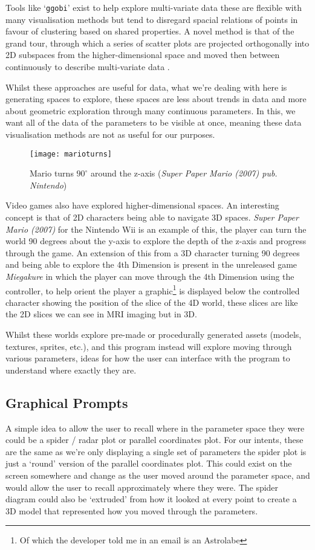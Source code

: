 Tools like `\verb|ggobi|' exist to help explore multi-variate data
\citep{swayne:dsc2003} these are flexible with many visualisation methods but
tend to disregard spacial relations of points in favour of clustering based on
shared properties. A novel method is that of the grand tour, through which a
series of scatter plots are projected orthogonally into 2D subspaces from the
higher-dimensional space and moved then between continuously to describe
multi-variate data \citep{asimov1985grand}.

Whilst these approaches are useful for data, what we're dealing with here is
generating spaces to explore, these spaces are less about trends in data and
more about geometric exploration through many continuous parameters. In this, we
want all of the data of the parameters to be visible at once, meaning these data
visualisation methods are not as useful for our purposes.

\begin{figure}[H]
    \centering
    \texttt{[image: marioturns]}
    \caption{Mario turns $90^\circ$ around the z-axis (\emph{Super Paper Mario
    (2007) pub. Nintendo})}
\end{figure}

Video games also have explored higher-dimensional spaces. An interesting concept
is that of 2D characters being able to navigate 3D spaces.  \emph{Super Paper
Mario (2007)} for the Nintendo Wii is an example of this, the player can turn
the world 90 degrees about the y-axis to explore the depth of the z-axis and
progress through the game. An extension of this from a 3D character turning 90
degrees and being able to explore the 4th Dimension is present in the unreleased
game \emph{Miegakure} in which the player can move through the 4th Dimension
using the controller, to help orient the player a graphic\footnote{Of which the
developer told me in an email is an Astrolabe} is displayed below the controlled
character showing the position of the slice of the 4D world, these slices are
like the 2D slices we can see in MRI imaging but in 3D.

Whilst these worlds explore pre-made or procedurally generated assets (models,
textures, sprites, etc.), and this program instead will explore moving through
various parameters, ideas for how the user can interface with the program to
understand where exactly they are.

\subsection{Graphical Prompts}
A simple idea to allow the user to recall where in the parameter space they were
could be a spider / radar plot or parallel coordinates plot. For our intents, these
are the same as we're only displaying a single set of parameters the spider plot
is just a `round' version of the parallel coordinates plot. This could exist on
the screen somewhere and change as the user moved around the parameter space,
and would allow the user to recall approximately where they were. The spider
diagram could also be `extruded' from how it looked at every point to create a
3D model that represented how you moved through the parameters.

